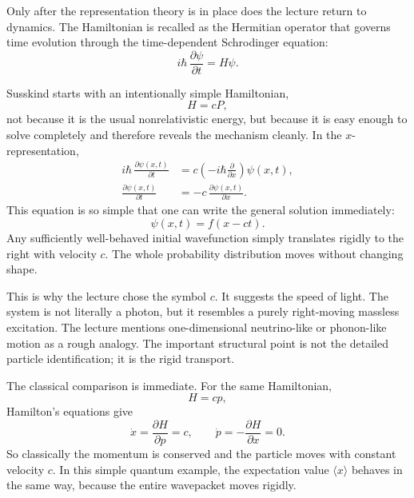Only after the representation theory is in place does the lecture return to dynamics. The Hamiltonian is recalled as the Hermitian operator that governs time evolution through the time-dependent Schrodinger equation:
\begin{equation}
i\hbar\,\frac{\partial \psi}{\partial t}=H\psi.
\end{equation}

Susskind starts with an intentionally simple Hamiltonian,
\begin{equation}
H=cP,
\end{equation}
not because it is the usual nonrelativistic energy, but because it is easy enough to solve completely and therefore reveals the mechanism cleanly. In the $x$-representation,
\begin{align}
i\hbar\,\frac{\partial \psi(x,t)}{\partial t}
&=c\left(-i\hbar\frac{\partial}{\partial x}\right)\psi(x,t), \\
\frac{\partial \psi(x,t)}{\partial t}
&=-c\,\frac{\partial \psi(x,t)}{\partial x}.
\end{align}
This equation is so simple that one can write the general solution immediately:
\begin{equation}
\psi(x,t)=f(x-ct).
\end{equation}
Any sufficiently well-behaved initial wavefunction simply translates rigidly to the right with velocity $c$. The whole probability distribution moves without changing shape.

This is why the lecture chose the symbol $c$. It suggests the speed of light. The system is not literally a photon, but it resembles a purely right-moving massless excitation. The lecture mentions one-dimensional neutrino-like or phonon-like motion as a rough analogy. The important structural point is not the detailed particle identification; it is the rigid transport.

The classical comparison is immediate. For the same Hamiltonian,
\begin{equation}
H=cp,
\end{equation}
Hamilton's equations give
\begin{equation}
\dot{x}=\frac{\partial H}{\partial p}=c,
\qquad
\dot{p}=-\frac{\partial H}{\partial x}=0.
\end{equation}
So classically the momentum is conserved and the particle moves with constant velocity $c$. In this simple quantum example, the expectation value $\langle x\rangle$ behaves in the same way, because the entire wavepacket moves rigidly.

